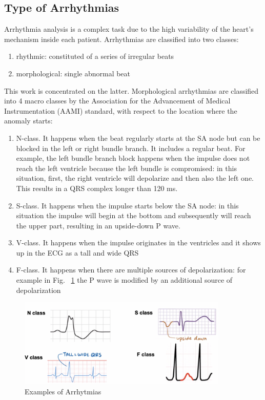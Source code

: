 \documentclass[LaM,binding=0.6cm]{sapthesis}
\begin{document}
\subsection{Type of Arrhythmias}
Arrhythmia analysis is a complex task due to the high variability of the heart's mechanism inside each patient. Arrhythmias are classified into two classes:
\begin{enumerate}
\item rhythmic: constituted of a series of irregular beats
\item morphological: single abnormal beat
\end{enumerate}
This work is concentrated on the latter. Morphological arrhythmias are classified into 4 macro classes by the Association for the Advancement of Medical Instrumentation (AAMI) standard, with respect to the location where the anomaly starts:
\begin{enumerate}
\item N-class. It happens when the beat regularly starts at the SA node but can be blocked in the left or right bundle branch. It includes a regular beat. For example, the left bundle branch block happens when the impulse does not reach the left ventricle because the left bundle is compromised: in this situation, first, the right ventricle will depolarize and then also the left one. This results in a QRS complex longer than 120 ms.
\item S-class. It happens when the impulse starts below the SA node: in this situation the impulse will begin at the bottom and subsequently will reach the upper part, resulting in an upside-down P wave.
\item V-class. It happens when the impulse originates in the ventricles and it shows up in the ECG as a tall and wide QRS
\item F-class. It happens when there are multiple sources of depolarization: for example in Fig. ~\ref{fig:arrhex} the P wave is modified by an additional source of depolarization
\end{enumerate}
\begin{figure}   \centering
    \includegraphics[width=100mm,scale=0.7]{arrhex}
    \caption{Examples of Arrhytmias}
    \label{fig:arrhex}
\end{figure}
\end{document}
